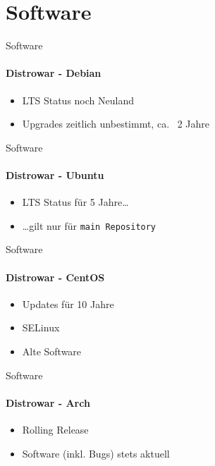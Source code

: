 \section{Software}

\begin{frame}{Software}
\framesubtitle{Distrowar - Debian}
\begin{itemize}
\item LTS Status noch Neuland
\pause
\item Upgrades zeitlich unbestimmt, ca. ~2 Jahre
\end{itemize}
\end{frame}

\begin{frame}{Software}
\framesubtitle{Distrowar - Ubuntu}
\begin{itemize}
\item LTS Status für 5 Jahre…
\pause
\item …gilt nur für \tt{main} Repository
\end{itemize}
\end{frame}

\begin{frame}{Software}
\framesubtitle{Distrowar - CentOS}
\begin{itemize}
\item Updates für 10 Jahre
\pause
\item SELinux
\pause
\item Alte Software
\end{itemize}
\end{frame}

\begin{frame}{Software}
\framesubtitle{Distrowar - Arch}
\begin{itemize}
\item Rolling Release
\pause
\item Software (inkl. Bugs) stets aktuell
\end{itemize}
\end{frame}
